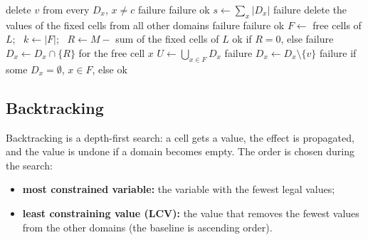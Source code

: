 \documentclass[11pt,a4paper]{article}
\begin{document}
\begin{algorithm}[H]
\small
\caption{Constraint propagation}
\label{alg:prop}
\begin{algorithmic}[1]
  \State delete $v$ from every $D_x$, $x\neq c$
   \State \Return failure \EndIf
     \State \Return failure \EndIf
  \EndFor
  \State \Return ok
\EndFunction
\Statex
{} 
  \Repeat
    \State $s\gets\sum_x|D_x|$
     \State \Return failure \EndIf
    \State delete the values of the fixed cells from all other domains
     \State \Return failure \EndIf
       \State \Return failure \EndIf
    \EndFor
  \State \Return ok
\EndFunction
\Statex
{}
  \State $F\gets$ free cells of $L$; \ $k\gets|F|$; \ $R\gets M-$ sum of the fixed cells of $L$
   \State \Return ok if $R=0$, else failure \EndIf
    \State $D_x\gets D_x\cap\{R\}$ for the free cell $x$
  \Else
    \State $U\gets\bigcup_{x\in F}D_x$
     \State \Return failure \EndIf
       \State $D_x\gets D_x\setminus\{v\}$ \EndIf
    \EndFor
  \EndIf
  \State \Return failure if some $D_x=\emptyset$, $x\in F$, else ok
\EndFunction
\end{algorithmic}
\end{algorithm}

\subsection{Backtracking}

Backtracking is a depth-first search: a cell gets a value, the effect is
propagated, and the value is undone if a domain becomes empty. The order
is chosen during the search:
\begin{itemize}[nosep]
  \item \textbf{most constrained variable:} the variable with the fewest
        legal values;
  \item \textbf{least constraining value (LCV):} the value that removes
        the fewest values from the other domains (the baseline is
        ascending order).
\end{itemize}
\end{document}
